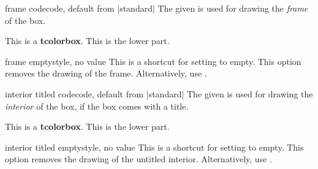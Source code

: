 \begin{docTcbKey}{frame code}{}{code, default from |standard|}
  The given  is used for drawing the \emph{frame} of the box.
\begin{dispExample}

\begin{tcolorbox}[enhanced,frame code={
  \foreach \n in {north east,north west,south east,south west}
  {\path [fill=red!75!black] (interior.\n) circle (3mm); } }]
This is a \textbf{tcolorbox}.
\tcblower
This is the lower part.
\end{tcolorbox}
\end{dispExample}
\end{docTcbKey}


\begin{docTcbKey}{frame empty}{}{style, no value}
  This is a shortcut for setting   to empty.
  This option removes the drawing of the frame.
  Alternatively, use .
\end{docTcbKey}


\begin{docTcbKey}{interior titled code}{}{code, default from |standard|}
  The given  is used
  for drawing the \emph{interior} of the box, if the box comes with a title.
\begin{dispExample}

\begin{tcolorbox}[enhanced,title=My title,interior titled code={
  \path[draw=red!5!white,line width=5mm,line cap=round]
    ([xshift=3mm,yshift=-3mm]interior.north west)
    --([xshift=-3mm,yshift=3mm]interior.south east)
    ([xshift=3mm,yshift=3mm]interior.south west)
    --([xshift=-3mm,yshift=-3mm]interior.north east);}]
This is a \textbf{tcolorbox}.
\tcblower
This is the lower part.
\end{tcolorbox}
\end{dispExample}
\end{docTcbKey}


\begin{docTcbKey}{interior titled empty}{}{style, no value}
  This is a shortcut for setting   to empty.
  This option removes the drawing of the untitled interior.
  Alternatively, use .
\end{docTcbKey}



